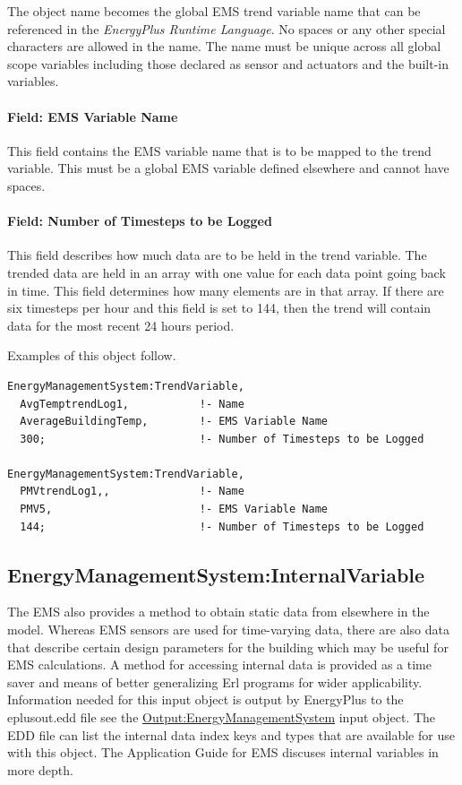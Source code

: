 The object name becomes the global EMS trend variable name that can be referenced in the \emph{EnergyPlus Runtime Language}. No spaces or any other special characters are allowed in the name. The name must be unique across all global scope variables including those declared as sensor and actuators and the built-in variables.

\paragraph{Field: EMS Variable Name}\label{field-ems-variable-name-2}

This field contains the EMS variable name that is to be mapped to the trend variable. This must be a global EMS variable defined elsewhere and cannot have spaces.

\paragraph{Field: Number of Timesteps to be Logged}\label{field-number-of-timesteps-to-be-logged}

This field describes how much data are to be held in the trend variable. The trended data are held in an array with one value for each data point going back in time. This field determines how many elements are in that array. If there are six timesteps per hour and this field is set to 144, then the trend will contain data for the most recent 24 hours period.

Examples of this object follow.

\begin{lstlisting}
EnergyManagementSystem:TrendVariable,
  AvgTemptrendLog1,           !- Name
  AverageBuildingTemp,        !- EMS Variable Name
  300;                        !- Number of Timesteps to be Logged

EnergyManagementSystem:TrendVariable,
  PMVtrendLog1,,              !- Name
  PMV5,                       !- EMS Variable Name
  144;                        !- Number of Timesteps to be Logged
\end{lstlisting}

\subsection{EnergyManagementSystem:InternalVariable}\label{energymanagementsysteminternalvariable}

The EMS also provides a method to obtain static data from elsewhere in the model. Whereas EMS sensors are used for time-varying data, there are also data that describe certain design parameters for the building which may be useful for EMS calculations. A method for accessing internal data is provided as a time saver and means of better generalizing Erl programs for wider applicability. Information needed for this input object is output by EnergyPlus to the eplusout.edd file see the \hyperref[outputenergymanagementsystem]{Output:EnergyManagementSystem} input object. The EDD file can list the internal data index keys and types that are available for use with this object. The Application Guide for EMS discuses internal variables in more depth.


